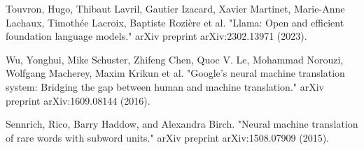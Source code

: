 \documentclass[runningheads]{llncs}
\begin{document}
\begin{thebibliography}{8}
Touvron, Hugo, Thibaut Lavril, Gautier Izacard, Xavier Martinet, Marie-Anne Lachaux, Timothée Lacroix, Baptiste Rozière et al. "Llama: Open and efficient foundation language models." arXiv preprint arXiv:2302.13971 (2023).

Wu, Yonghui, Mike Schuster, Zhifeng Chen, Quoc V. Le, Mohammad Norouzi, Wolfgang Macherey, Maxim Krikun et al. "Google's neural machine translation system: Bridging the gap between human and machine translation." arXiv preprint arXiv:1609.08144 (2016).

Sennrich, Rico, Barry Haddow, and Alexandra Birch. "Neural machine translation of rare words with subword units." arXiv preprint arXiv:1508.07909 (2015).
\end{thebibliography}
\end{document}
